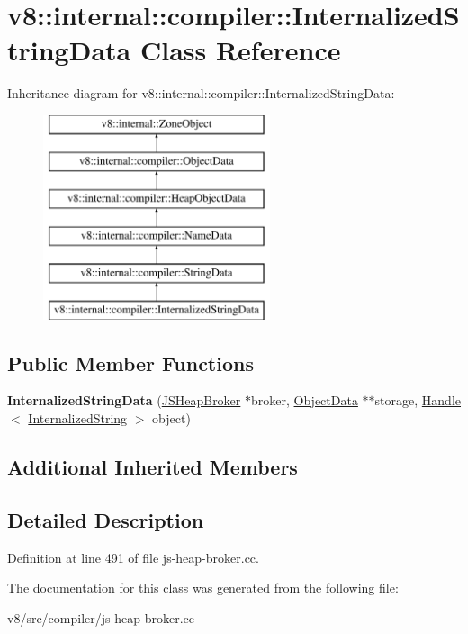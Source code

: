 \hypertarget{classv8_1_1internal_1_1compiler_1_1InternalizedStringData}{}\section{v8\+:\+:internal\+:\+:compiler\+:\+:Internalized\+String\+Data Class Reference}
\label{classv8_1_1internal_1_1compiler_1_1InternalizedStringData}
Inheritance diagram for v8\+:\+:internal\+:\+:compiler\+:\+:Internalized\+String\+Data\+:\begin{figure}[H]
\begin{center}
\leavevmode
\includegraphics[height=6.000000cm]{classv8_1_1internal_1_1compiler_1_1InternalizedStringData}
\end{center}
\end{figure}
\subsection*{Public Member Functions}
\begin{DoxyCompactItemize}
\item 
\mbox{\label{classv8_1_1internal_1_1compiler_1_1InternalizedStringData_aa14581fcdec599c7af8667131e094932}} 
{\bfseries Internalized\+String\+Data} (\mbox{\hyperlink{classv8_1_1internal_1_1compiler_1_1JSHeapBroker}{J\+S\+Heap\+Broker}} $\ast$broker, \mbox{\hyperlink{classv8_1_1internal_1_1compiler_1_1ObjectData}{Object\+Data}} $\ast$$\ast$storage, \mbox{\hyperlink{classv8_1_1internal_1_1Handle}{Handle}}$<$ \mbox{\hyperlink{classv8_1_1internal_1_1InternalizedString}{Internalized\+String}} $>$ object)
\end{DoxyCompactItemize}
\subsection*{Additional Inherited Members}


\subsection{Detailed Description}


Definition at line 491 of file js-\/heap-\/broker.\+cc.



The documentation for this class was generated from the following file\+:\begin{DoxyCompactItemize}
\item 
v8/src/compiler/js-\/heap-\/broker.\+cc\end{DoxyCompactItemize}
